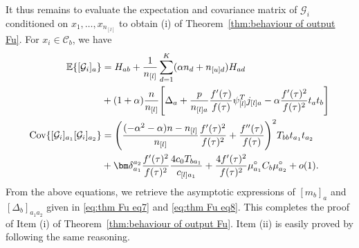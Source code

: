 \documentclass[twoside,11pt]{article}
\begin{document}
It thus remains to evaluate the expectation and covariance matrix of $\mathcal{G}_i$ conditioned on $x_1,\ldots,x_{n_{[l]}}$ to obtain (i) of Theorem~\ref{thm:behaviour of output Fu}. For $x_i\in\mathcal{C}_b$, we have
\begin{align*}
	\mathbb{E}\{[\mathcal{G}_i]_a\}&=H_{ab}+\frac{1}{n_{[l]}}\sum_{d=1}^{K}(\alpha n_{d}+n_{[u]d})H_{ad}\nonumber \\
	&+(1+\alpha)\frac{ n}{n_{[l]}}\Bigg[\Delta_{a}+\frac{p}{n_{[l]a}}\frac{f'(\tau)}{f(\tau)}\psi_{[l]}^Tj_{[l]a}-\alpha\frac{f'(\tau)^2}{f(\tau)^2}t_{a}t_{b}\Bigg]\\
	{\rm Cov}\{[\mathcal{G}_i]_{a_1}[\mathcal{G}_i]_{a_2}\}&=\Bigg(\frac{(-\alpha^{2}-\alpha)n-n_{[l]}}{n_{[l]}}\frac{f'(\tau)^{2}}{f(\tau)^{2}}+\frac{f''(\tau)}{f(\tau)}\Bigg)^{2}T_{bb}t_{a_{1}}t_{a_{2}}\nonumber \\
	&+{\bm\delta}_{a_{1}}^{a_{2}}\frac{f'(\tau)^{2}}{f(\tau)^{2}}\frac{4c_0T_{ba_1}}{c_{[l]a_1}}+\frac{4f'(\tau)^{2}}{f(\tau)^{2}}\mu^{\circ}_{a_{1}}C_{b}\mu^{\circ}_{a_{2}}+o(1).
\end{align*}
From the above equations, we retrieve the asymptotic expressions of $[m_{b}]_{a}$ and $[\Delta_b]_{a_1a_2}$ given in \eqref{eq:thm Fu eq7} and \eqref{eq:thm Fu eq8}. This completes the proof of Item (i) of Theorem~\ref{thm:behaviour of output Fu}. Item (ii) is easily proved by following the same reasoning.
\end{document}
